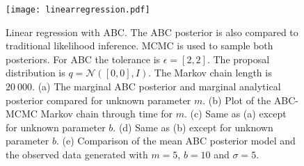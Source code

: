 \begin{figure}[H]	
	\centering
	\texttt{[image: linearregression.pdf]}
	\caption{Linear regression with ABC. The ABC posterior is also compared to traditional likelihood inference. MCMC is used to sample both posteriors. For ABC the tolerance is $\epsilon = [2,2]$. The proposal distribution is $q = \mathcal{N}([0,0],I)$. The Markov chain length is $20\ 000$. (a) The marginal ABC posterior and marginal analytical posterior compared for unknown parameter $m$. (b) Plot of the ABC-MCMC Markov chain through time for $m$. (c) Same as (a) except for unknown parameter $b$. (d) Same as (b) except for unknown parameter $b$. (e) Comparison of the mean ABC posterior model and the observed data generated with $m = 5$, $b = 10$ and $\sigma = 5$.}
	\label{linear-regression}
\end{figure}

